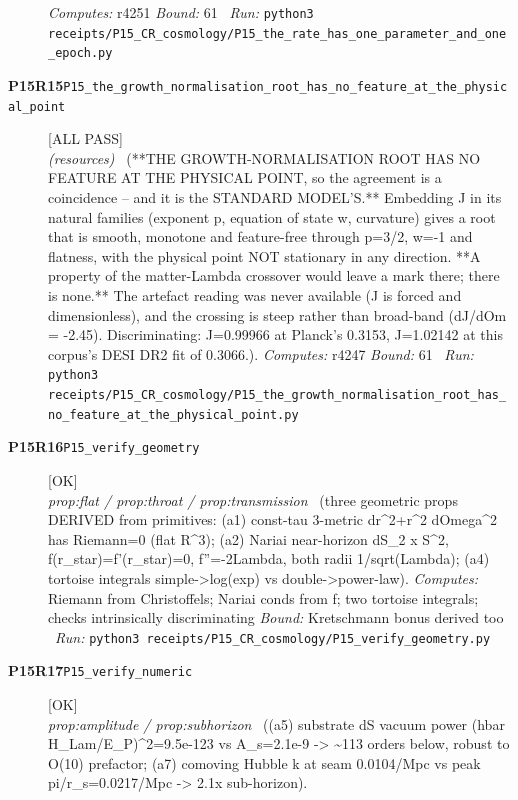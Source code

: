 \begin{description}
\emph{Computes:} r4251
 \emph{Bound:} 61
\ \emph{Run:} \texttt{python3 receipts/P15\_CR\_cosmology/P15\_the\_rate\_has\_one\_parameter\_and\_one\_epoch.py}
\item[\rcptlabel{P15_the_growth_normalisation_root_has_no_feature_at_the_physical_point}{P15R15}\textbf{P15R15}\quad\texttt{P15\_the\_growth\_normalisation\_root\_has\_no\_feature\_at\_the\_physical\_point}]\hfill\textsf{[ALL PASS]}\\
\textit{(resources)} \ (**THE GROWTH-NORMALISATION ROOT HAS NO FEATURE AT THE PHYSICAL POINT, so the agreement is a coincidence -- and it is the STANDARD MODEL'S.** Embedding J in its natural families (exponent p, equation of state w, curvature) gives a root that is smooth, monotone and feature-free through p=3/2, w=-1 and flatness, with the physical point NOT stationary in any direction. **A property of the matter-Lambda crossover would leave a mark there; there is none.** The artefact reading was never available (J is forced and dimensionless), and the crossing is steep rather than broad-band (dJ/dOm = -2.45). Discriminating: J=0.99966 at Planck's 0.3153, J=1.02142 at this corpus's DESI DR2 fit of 0.3066.). 
\emph{Computes:} r4247
 \emph{Bound:} 61
\ \emph{Run:} \texttt{python3 receipts/P15\_CR\_cosmology/P15\_the\_growth\_normalisation\_root\_has\_no\_feature\_at\_the\_physical\_point.py}
\item[\rcptlabel{P15_verify_geometry}{P15R16}\textbf{P15R16}\quad\texttt{P15\_verify\_geometry}]\hfill\textsf{[OK]}\\
\textit{prop:flat / prop:throat / prop:transmission} \ (three geometric props DERIVED from primitives: (a1) const-tau 3-metric dr\textasciicircum{}2+r\textasciicircum{}2 dOmega\textasciicircum{}2 has Riemann=0 (flat R\textasciicircum{}3); (a2) Nariai near-horizon dS\_2 x S\textasciicircum{}2, f(r\_star)=f'(r\_star)=0, f''=-2Lambda, both radii 1/sqrt(Lambda); (a4) tortoise integrals simple->log(exp) vs double->power-law). 
\emph{Computes:} Riemann from Christoffels; Nariai conds from f; two tortoise integrals; checks intrinsically discriminating
 \emph{Bound:} Kretschmann bonus derived too
\ \emph{Run:} \texttt{python3 receipts/P15\_CR\_cosmology/P15\_verify\_geometry.py}
\item[\rcptlabel{P15_verify_numeric}{P15R17}\textbf{P15R17}\quad\texttt{P15\_verify\_numeric}]\hfill\textsf{[OK]}\\
\textit{prop:amplitude / prop:subhorizon} \ ((a5) substrate dS vacuum power (hbar H\_Lam/E\_P)\textasciicircum{}2=9.5e-123 vs A\_s=2.1e-9 -> \textasciitilde{}113 orders below, robust to O(10) prefactor; (a7) comoving Hubble k at seam 0.0104/Mpc vs peak pi/r\_s=0.0217/Mpc -> 2.1x sub-horizon). 

\end{description}
